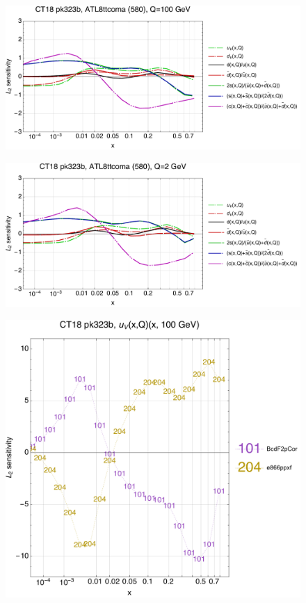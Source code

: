 \documentclass[10pt,aps,prd,floatfix,titlepage]{revtex4}
\begin{document}
\clearpage
\begin{figure}
\includegraphics[width=\textwidth,height=0.44\textheight,keepaspectratio]{2/580_ct18nn_q100_Sf_2.pdf}
\caption{}
\end{figure}
\begin{figure}
\includegraphics[width=\textwidth,height=0.44\textheight,keepaspectratio]{2/580_ct18nn_q2_Sf_2.pdf}
\caption{}
\end{figure}
\clearpage
\begin{figure}
\includegraphics[width=\textwidth,height=0.44\textheight,keepaspectratio]{2/rat_ifl1_ct18nn_L2_q100_Sf_2.pdf}
\caption{}
\end{figure}
\end{document}
